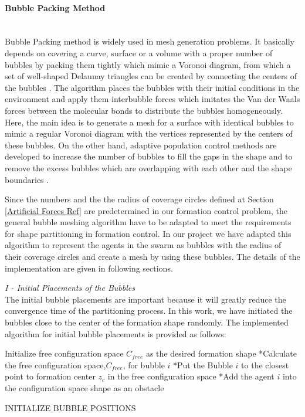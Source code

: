 \paragraph{Bubble Packing Method} \hspace{0pt} \\				
Bubble Packing method is widely used in mesh generation problems. It basically depends on covering a curve, surface or a volume with a proper number of bubbles by packing them tightly which mimic a Voronoi diagram, from which a set of well-shaped Delaunay triangles can be created by connecting the centers of the bubbles \cite{27}.  The algorithm places the bubbles with their initial conditions in the environment and apply them interbubble forces which imitates the Van der Waals forces between the molecular bonds  to distribute the bubbles homogeneously. Here, the main idea is to generate a mesh for a surface with identical bubbles to mimic a regular Voronoi diagram with the vertices represented by the centers of these bubbles. On the other hand, adaptive population control  methods are developed to increase the number of bubbles to fill the gaps in the shape and to remove the excess bubbles which are overlapping with each other and the shape boundaries \cite{27}. 

Since the numbers and the the radius of coverage circles defined at Section \ref{Artificial Forces Ref} are predetermined in our formation control problem, the general bubble meshing algorithm have to be adapted to meet the requirements for shape partitioning in formation control.  In our project we have adapted this algorithm to represent the agents in the swarm as bubbles with the radius of their coverage circles and create a mesh by using these bubbles. The details of the implementation are given in following sections.\newline
			
\textit{			I - Initial Placements of the Bubbles} \\ 
The initial bubble placements are important because it will greatly reduce the convergence time of the partitioning process. In this work, we have initiated the bubbles close to the center of the formation shape randomly. The implemented algorithm for initial bubble placements is provided as follows:
			
\begin{algorithm}[H]
Initialize free configuration space $C_{free}$ as the desired formation shape \newline
{}
{		
*Calculate the free configuration space,$C_{free}$, for bubble $i$\;
*Put the Bubble $i$ to the closest point to  formation center  $z_c$  in the free configuration space\;
*Add the agent $i$ into the configuration space shape as an obstacle \;
}\		
\caption{INITIALIZE$\_$BUBBLE$\_$POSITIONS}
\end{algorithm}
		
